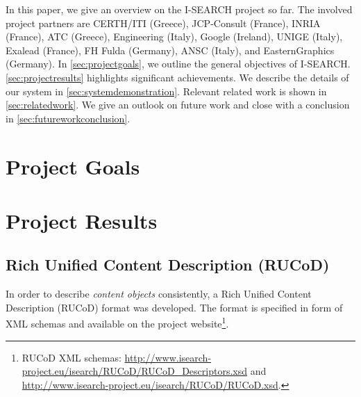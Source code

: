 \documentclass{acm_proc_article-sp}
\let\oldemph\emph
\renewcommand{\emph}[1]{\oldemph{\fontsize{9}{9}\selectfont #1}}
\newcommand{\inlinelistingsize}{\fontsize{8pt}{11pt}}
\let\oldurl\url
\renewcommand{\url}[1]{\inlinelistingsize\oldurl{#1}}
\begin{document}
In this paper, we give an overview on the \mbox{I-SEARCH} project so far.
The involved project partners are CERTH/ITI (Greece), JCP-Consult (France), INRIA (France), ATC (Greece), Engineering (Italy), Google (Ireland), UNIGE (Italy), Exalead (France), FH Fulda (Germany), ANSC (Italy), and EasternGraphics (Germany).
In \autoref{sec:projectgoals}, we outline the general objectives of  \mbox{I-SEARCH}.
\autoref{sec:projectresults} highlights significant achievements.
We describe the details of our system in \autoref{sec:systemdemonstration}.
Relevant related work is shown in \autoref{sec:relatedwork}.
We give an outlook on future work and close with a conclusion in \autoref{sec:futureworkconclusion}.

\section{Project Goals} \label{sec:projectgoals}


\section{Project Results} \label{sec:projectresults}

\subsection{Rich Unified Content Description (RUCoD)}
In order to describe \emph{content objects} consistently, a Rich Unified Content Description (RUCoD) format was developed.
The format is specified in form of XML schemas and available on the project website\footnote{RUCoD XML schemas: \url{http://www.isearch-project.eu/isearch/RUCoD/RUCoD_Descriptors.xsd} and \url{http://www.isearch-project.eu/isearch/RUCoD/RUCoD.xsd}.}.
\end{document}
